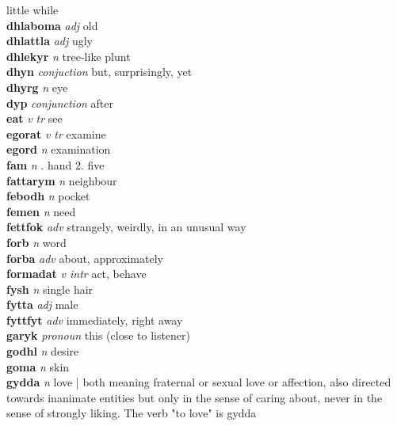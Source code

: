 little while\\\textbf{dhlaboma}   \emph{adj} \textperiodcentered old\\\textbf{dhlattla}   \emph{adj} \textperiodcentered ugly\\\textbf{dhlekyr}   \emph{n} \textperiodcentered tree-like plunt\\\textbf{dhyn}   \emph{conjuction} \textperiodcentered but, surprisingly, yet\\\textbf{dhyrg}   \emph{n} \textperiodcentered eye\\\textbf{dyp}   \emph{conjunction} \textperiodcentered after\\\textbf{eat}   \emph{v tr} \textperiodcentered see\\\textbf{egorat}   \emph{v tr} \textperiodcentered examine\\\textbf{egord}   \emph{n} \textperiodcentered examination\\\textbf{fam}   \emph{n} . hand 2. five \\\textbf{fattarym}   \emph{n} \textperiodcentered neighbour\\\textbf{febodh}   \emph{n} \textperiodcentered pocket\\\textbf{femen}   \emph{n} \textperiodcentered need\\\textbf{fettfok}   \emph{adv} \textperiodcentered strangely, weirdly, in an unusual way\\\textbf{forb}   \emph{n} \textperiodcentered word\\\textbf{forba}   \emph{adv} \textperiodcentered about, approximately\\\textbf{formadat}   \emph{v intr} \textperiodcentered act, behave\\\textbf{fysh}   \emph{n} \textperiodcentered single hair\\\textbf{fytta}   \emph{adj} \textperiodcentered male\\\textbf{fyttfyt}   \emph{adv} \textperiodcentered immediately, right away\\\textbf{garyk}   \emph{pronoun} \textperiodcentered this (close to listener)\\\textbf{godhl}   \emph{n} \textperiodcentered desire\\\textbf{goma}   \emph{n} \textperiodcentered skin\\\textbf{gydda}   \emph{n} \textperiodcentered love | both meaning fraternal or sexual love or affection, also directed towards inanimate entities but only in the sense of caring about, never in the sense of strongly liking. The verb "to love" is gydda 
